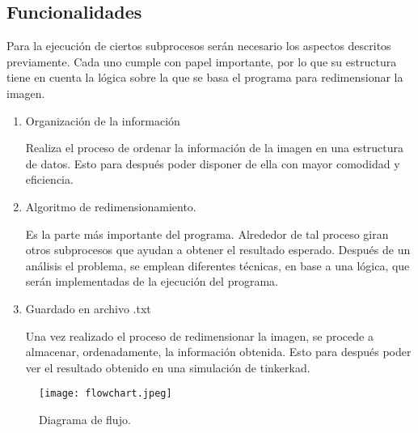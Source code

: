 \documentclass{article}
\begin{document}
\subsection{Funcionalidades} \label{Fucionalidades}
Para la ejecución de ciertos subprocesos serán necesario los aspectos descritos previamente. Cada uno cumple con papel importante, por lo que su estructura tiene en cuenta la lógica sobre la que se basa el programa para redimensionar la imagen. 

\begin{enumerate}
    \item Organización de la información 
    
    Realiza el proceso de ordenar la información de la imagen en una estructura de datos. Esto para después poder disponer de ella con mayor comodidad y eficiencia. 
    
    \item Algoritmo de redimensionamiento. 
    
    Es la parte más importante del programa. Alrededor de tal proceso giran otros subprocesos que ayudan a obtener el resultado esperado. 
    Después de un análisis el problema, se emplean diferentes técnicas, en base a una lógica, que serán implementadas de la ejecución del programa. 
    
    \item Guardado en archivo .txt
    
    Una vez realizado el proceso de redimensionar la imagen, se procede a almacenar, ordenadamente, la información obtenida. Esto para después poder ver el resultado obtenido en una simulación de tinkerkad. 
    
\end{enumerate}
\begin{figure}[h]
  \texttt{[image: flowchart.jpeg]}
  \centering
  \caption{Diagrama de flujo.}
  \label{fig:flowchart}
\end{figure}
\end{document}
